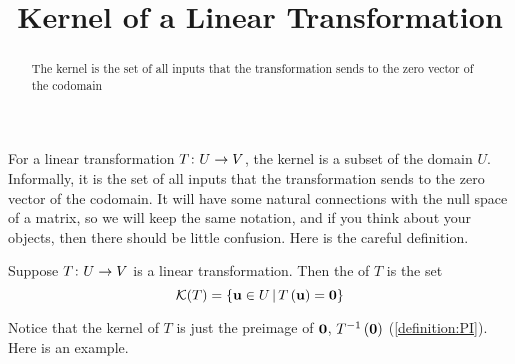 \documentclass{ximera}
\title{Kernel of a Linear Transformation}
\begin{document}
\begin{abstract}
  The kernel is the set of all inputs that the transformation sends to
  the zero vector of the codomain
\end{abstract}
\maketitle

For a linear transformation $T\colon U\rightarrow V$, the kernel is a subset of the domain $U$.  Informally, it is the set of all inputs that the transformation sends to the zero vector of the codomain.  It will have some natural connections with the null space of a matrix, so we will keep the same notation, and if you think about your objects, then there should be little confusion.  Here is the careful definition.

\begin{definition}
Suppose $T\colon U\rightarrow V$ is a linear transformation.  Then the  of $T$ is the set
\[
\mathcal{K}\!\left(T\right)=\left\lbrace\mathbf{u}\in U\,\middle|\,T\left(\mathbf{u}\right)=\mathbf{0}\right\rbrace
\]
\end{definition}

Notice that the kernel of $T$ is just the preimage of $\mathbf{0}$, $T^{-1}\left(\mathbf{0}\right)$ (\ref{definition:PI}).  Here is an example.
\end{document}
